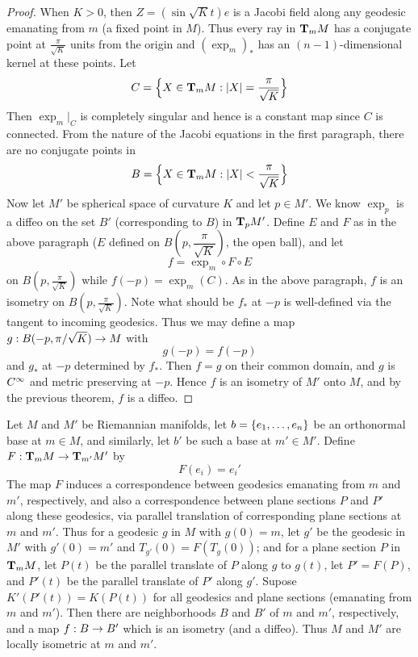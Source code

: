 \documentclass[../main]{subfiles}
\begin{document}
\begin{proof}
When $K>0$, then $Z=(\sin\sqrt Kt)e$ is a Jacobi field along any geodesic emanating from $m$ (a fixed point in $M$). Thus every ray in $\ts Mm$ has a conjugate point at $\frac{\pi}{\sqrt K}$ units from the origin and $(\exp_m)_*$ has an $(n-1)$-dimensional kernel at these points. Let
\[C = \Big\{X\in\ts Mm: \norm X=\frac{\pi}{\sqrt K}\Big\}\]
Then $\exp_m|_C$ is completely singular and hence is a constant map since $C$ is connected. From the nature of the Jacobi equations in the first paragraph, there are no conjugate points in
\[B = \Big\{X\in\ts Mm: \norm X<\frac{\pi}{\sqrt K}\Big\}\]
Now let $M'$ be spherical space of curvature $K$ and let $p\in M'$. We know $\exp_p$ is a diffeo on the set $B'$ (corresponding to $B$) in $\ts{M'}{p}$. Define $E$ and $F$ as in the above paragraph ($E$ defined on $B(p,\dfrac{\pi}{\sqrt K})$, the open ball), and let
\[f=\exp_m\circ F\circ E\]
on $B(p,\frac{\pi}{\sqrt K})$ while $f(-p)=\exp_m(C)$. As in the above paragraph, $f$ is an isometry on $B(p,\frac{\pi}{\sqrt K})$. Note what should be $f_*$ at $-p$ is well-defined via the tangent to incoming geodesics. Thus we may define a map $g:B(-p,\pi/\sqrt{K})\functionMaps M$ with
\[g(-p)=f(-p)\]
and $g_*$ at $-p$ determined by $f_*$. Then $f=g$ on their common domain, and $g$ is $\CInfty$ and metric preserving at $-p$. Hence $f$ is an isometry of $M'$ onto $M$, and by the previous theorem, $f$ is a diffeo.
\end{proof}



\begin{corollary} \label{cor:ch10.6.3}
Let $M$ and $M'$ be Riemannian manifolds, let $b=\brc{e_1,\ldots,e_n}$ be an orthonormal base at $m\in M$, and similarly, let $b'$ be such a base at $m'\in M'$. Define $F:\ts Mm\functionMaps\ts{M'}{m'}$ by
\[F(e_i)=e_i'\]
The map $F$ induces a correspondence between geodesics emanating from $m$ and $m'$, respectively, and also a correspondence between plane sections $P$ and $P'$ along these geodesics, via parallel translation of corresponding plane sections at $m$ and $m'$. Thus for a geodesic $g$ in $M$ with $g(0)=m$, let $g'$ be the geodesic in $M'$ with $g'(0)=m'$ and $T_{g'}(0)=F(T_g(0))$; and for a plane section $P$ in $\ts Mm$, let $P(t)$ be the parallel translate of $P$ along $g$ to $g(t)$, let $P'=F(P)$, and $P'(t)$ be the parallel translate of $P'$ along $g'$. Supose $K'(P'(t))=K(P(t))$ for all geodesics and plane sections (emanating from $m$ and $m'$). Then there are neighborhoods $B$ and $B'$ of $m$ and $m'$, respectively, and a map $f:B\functionMaps B'$ which is an isometry (and a diffeo). Thus $M$ and $M'$ are locally isometric at $m$ and $m'$.
\end{corollary}
\end{document}
